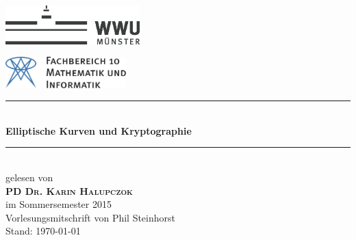 \begin{titlepage}
	\newcommand{\HRule}{\rule{\linewidth}{0.8mm}} 

	\center 
 
	\begin{minipage}{0.4\textwidth}
	\begin{flushleft}
	\includegraphics[height=1.5cm,keepaspectratio]{../!config/Bilder/wwulogo17.eps}\\[1cm]
	\end{flushleft}
	\end{minipage}
	\hfill
	\begin{minipage}{0.4\textwidth}
	\begin{flushright}
	\vspace*{0.3cm}
	\includegraphics[height=1.2cm,keepaspectratio]{../!config/Bilder/fb10logo.pdf} \
	\end{flushright}
	\end{minipage}

	\vspace{2cm}
	
	\HRule \\[0.8cm]
	{ \huge \sffamily\bfseries Elliptische Kurven und Kryptographie}\\[0.4cm] %
	\HRule \\[1cm]
 
	{\LARGE gelesen von} \\[.7cm]
	\textsc{\LARGE \textbf{PD Dr. Karin Halupczok}}\\[.7cm]
	{\LARGE im Sommersemester 2015}\\[2cm]


	\vfill
	{\Large Vorlesungsmitschrift von Phil Steinhorst} \\[.5cm]
	{\large Stand: \today}
	
\end{titlepage}
\cleardoubleemptypage